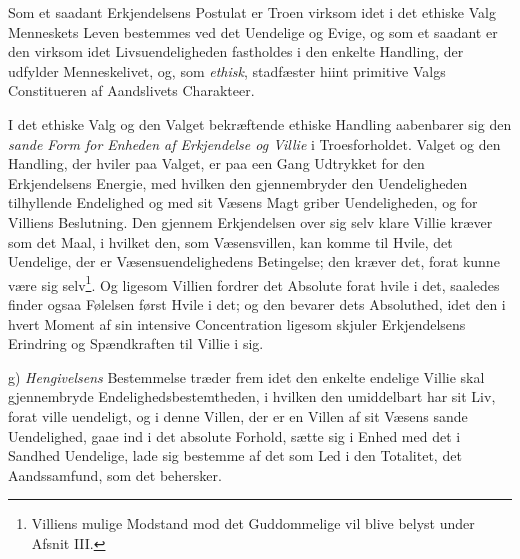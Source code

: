 Som et saadant Erkjendelsens Postulat er Troen virksom idet i det ethiske Valg
Menneskets Leven bestemmes ved det Uendelige og Evige, og som et saadant er
den virksom idet Livsuendeligheden fastholdes i den enkelte Handling, der
udfylder Menneskelivet, og, som \emph{ethisk}, stadfæster hiint primitive
Valgs Constitueren af Aandslivets Charakteer.

I det ethiske Valg og den Valget bekræftende ethiske Handling aabenbarer sig
den \emph{sande Form for Enheden af Erkjendelse og Villie} i Troesforholdet.
Valget og den Handling, der hviler paa Valget, er paa een Gang
 \setcounter{footnote}{0}%
Udtrykket for den Erkjendelsens Energie, med hvilken den gjennembryder den
Uendeligheden tilhyllende Endelighed og med sit Væsens Magt griber
Uendeligheden, og for Villiens Beslutning. Den gjennem Erkjendelsen over sig
selv klare Villie kræver som det Maal, i hvilket den, som Væsensvillen, kan
komme til Hvile, det Uendelige, der er Væsensuendelighedens Betingelse; den
kræver det, forat kunne være sig selv\footnote{Villiens mulige Modstand mod
det Guddommelige vil blive belyst under Afsnit III.}. Og ligesom Villien
fordrer det Absolute forat hvile i det, saaledes finder ogsaa Følelsen først
Hvile i det; og den bevarer dets Absoluthed, idet den i hvert Moment af sin
intensive Concentration ligesom skjuler Erkjendelsens Erindring og
Spændkraften til Villie i sig.

g) \emph{Hengivelsens} Bestemmelse træder frem idet den enkelte endelige
Villie skal gjennembryde Endelighedsbestemtheden, i hvilken den umiddelbart
har sit Liv, forat ville uendeligt, og i denne Villen, der er en Villen af sit
Væsens sande Uendelighed, gaae ind i det absolute Forhold, sætte sig i Enhed
med det i Sandhed Uendelige, lade sig bestemme af det som Led i den Totalitet,
det Aandssamfund, som det behersker.

